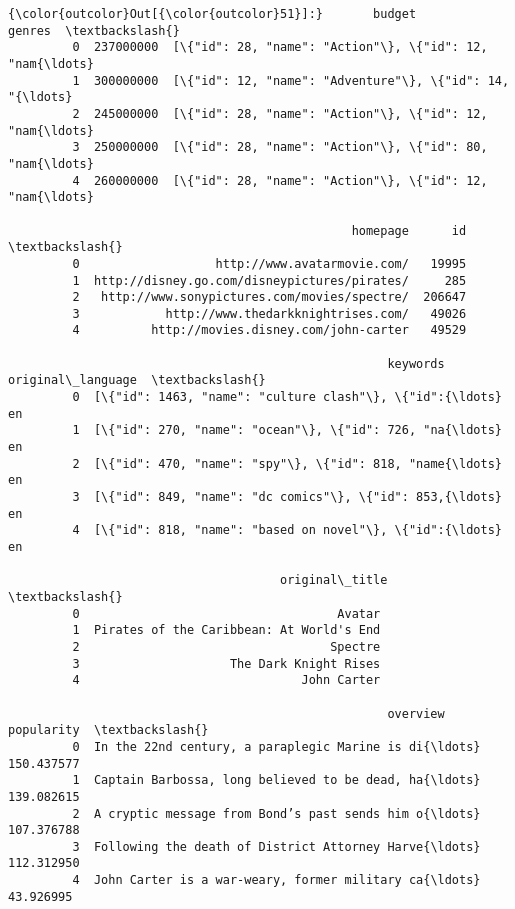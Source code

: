 \documentclass[11pt]{article}
\begin{document}
\begin{Verbatim}[commandchars=\\\{\}]
{\color{outcolor}Out[{\color{outcolor}51}]:}       budget                                             genres  \textbackslash{}
         0  237000000  [\{"id": 28, "name": "Action"\}, \{"id": 12, "nam{\ldots}   
         1  300000000  [\{"id": 12, "name": "Adventure"\}, \{"id": 14, "{\ldots}   
         2  245000000  [\{"id": 28, "name": "Action"\}, \{"id": 12, "nam{\ldots}   
         3  250000000  [\{"id": 28, "name": "Action"\}, \{"id": 80, "nam{\ldots}   
         4  260000000  [\{"id": 28, "name": "Action"\}, \{"id": 12, "nam{\ldots}   
         
                                                homepage      id  \textbackslash{}
         0                   http://www.avatarmovie.com/   19995   
         1  http://disney.go.com/disneypictures/pirates/     285   
         2   http://www.sonypictures.com/movies/spectre/  206647   
         3            http://www.thedarkknightrises.com/   49026   
         4          http://movies.disney.com/john-carter   49529   
         
                                                     keywords original\_language  \textbackslash{}
         0  [\{"id": 1463, "name": "culture clash"\}, \{"id":{\ldots}                en   
         1  [\{"id": 270, "name": "ocean"\}, \{"id": 726, "na{\ldots}                en   
         2  [\{"id": 470, "name": "spy"\}, \{"id": 818, "name{\ldots}                en   
         3  [\{"id": 849, "name": "dc comics"\}, \{"id": 853,{\ldots}                en   
         4  [\{"id": 818, "name": "based on novel"\}, \{"id":{\ldots}                en   
         
                                      original\_title  \textbackslash{}
         0                                    Avatar   
         1  Pirates of the Caribbean: At World's End   
         2                                   Spectre   
         3                     The Dark Knight Rises   
         4                               John Carter   
         
                                                     overview  popularity  \textbackslash{}
         0  In the 22nd century, a paraplegic Marine is di{\ldots}  150.437577   
         1  Captain Barbossa, long believed to be dead, ha{\ldots}  139.082615   
         2  A cryptic message from Bond’s past sends him o{\ldots}  107.376788   
         3  Following the death of District Attorney Harve{\ldots}  112.312950   
         4  John Carter is a war-weary, former military ca{\ldots}   43.926995   
         

\end{Verbatim}
\end{document}
